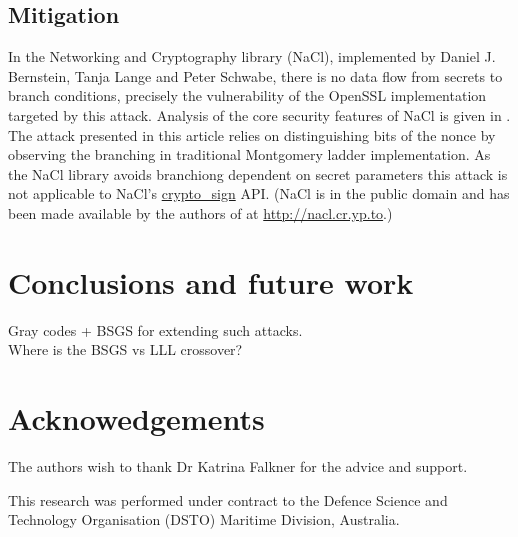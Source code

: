 \documentclass{llncs}
\newcommand{\starpar}[1]{\par{\footnotesize $\star$ \hl{#1}\par}}
\begin{document}
\subsection*{Mitigation}
In the Networking and Cryptography library (NaCl), implemented by Daniel J. Bernstein, Tanja Lange and Peter Schwabe, there is no data flow from secrets to branch conditions, precisely the vulnerability of the OpenSSL implementation targeted by this attack. Analysis of the core security features of NaCl is given in \cite{dan-tan-peter} . The attack presented in this article relies on distinguishing bits of the nonce by observing the branching in traditional Montgomery ladder implementation. As the NaCl library avoids branchiong dependent on secret parameters this attack is not applicable to NaCl's \url{crypto_sign} API. (NaCl is in the public domain and has been made available by the authors of \cite{dan-tan-peter} at \url{http://nacl.cr.yp.to}.)


\section{Conclusions and future work}
Gray codes + BSGS for extending such attacks.\\
Where is the BSGS vs LLL crossover?


\section{Acknowedgements}
The authors wish to thank Dr Katrina Falkner for the advice and support.

This research was performed under contract to the Defence
Science and Technology Organisation (DSTO) Maritime Division,
Australia.




\end{document}
